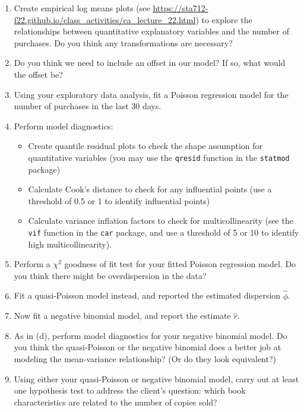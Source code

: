 \documentclass[11pt]{article}
\begin{document}
\begin{enumerate}
\begin{enumerate}
\item Create empirical log means plots (see \url{https://sta712-f22.github.io/class_activities/ca_lecture_22.html}) to explore the relationships between quantitative explanatory variables and the number of purchases. Do you think any transformations are necessary?

\item Do you think we need to include an offset in our model? If so, what would the offset be?

\item Using your exploratory data analysis, fit a Poisson regression model for the number of purchases in the last 30 days.

\item Perform model diagnostics:
\begin{itemize}
\item Create quantile residual plots to check the shape assumption for quantitative variables (you may use the \verb;qresid; function in the \verb;statmod; package)

\item Calculate Cook’s distance to check for any influential points (use a threshold of 0.5 or 1 to identify influential points)

\item Calculate variance inflation factors to check for multicollinearity (see the \verb;vif; function in the \verb;car; package, and use a threshold of 5 or 10 to identify high multicollinearity).
\end{itemize}

\item Perform a $\chi^2$ goodness of fit test for your fitted Poisson regression model. Do you think there might be overdispersion in the data?

\item Fit a quasi-Poisson model instead, and reported the estimated dispersion $\widehat{\phi}$.

\item Now fit a negative binomial model, and report the estimate $\widehat{r}$.

\item As in (d), perform model diagnostics for your negative binomial model. Do you think the quasi-Poisson or the negative binomial does a better job at modeling the mean-variance relationship? (Or do they look equivalent?)

\item Using either your quasi-Poisson or negative binomial model, carry out at least one hypothesis test to address the client's question: which book characteristics are related to the number of copies sold?
\end{enumerate}

\end{enumerate}
\end{document}
